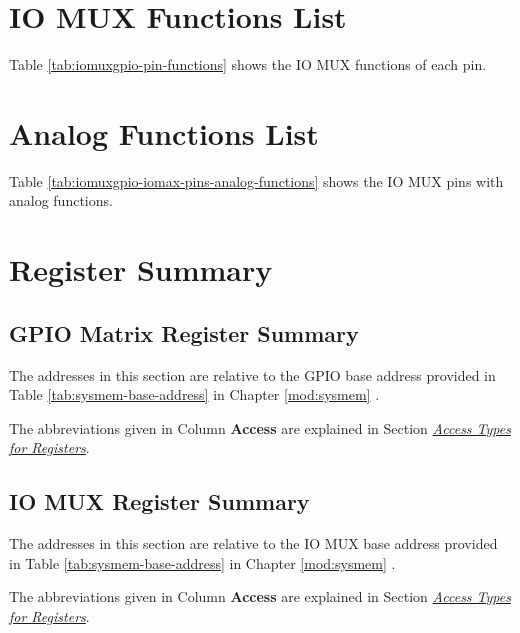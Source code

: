 \documentclass[main\_\_EN.tex]{subfiles}
\begin{document}
\section{IO MUX Functions List}
\label{sec:iomux_pads}
Table \ref{tab:iomuxgpio-pin-functions} shows the IO MUX functions of each pin.



\section{Analog Functions List}
\label{sec:rtcmux_pins}

Table \ref{tab:iomuxgpio-iomax-pins-analog-functions} shows the IO MUX pins with analog functions.






\hypertarget{iomuxgpio-reg-summ}{}
\section{Register Summary}

\subsection{GPIO Matrix Register Summary}
The addresses in this section are relative to the GPIO base address provided in Table \ref{tab:sysmem-base-address} in Chapter \ref{mod:sysmem} \textit{}.

The abbreviations given in Column \textbf{Access} are explained in Section \hyperref[glossary-access-types]{\textit{Access Types for Registers}}.




\subsection{IO MUX Register Summary}
The addresses in this section are relative to the IO MUX base address provided in Table \ref{tab:sysmem-base-address} in Chapter \ref{mod:sysmem} \textit{}.

The abbreviations given in Column \textbf{Access} are explained in Section \hyperref[glossary-access-types]{\textit{Access Types for Registers}}.


\end{document}
